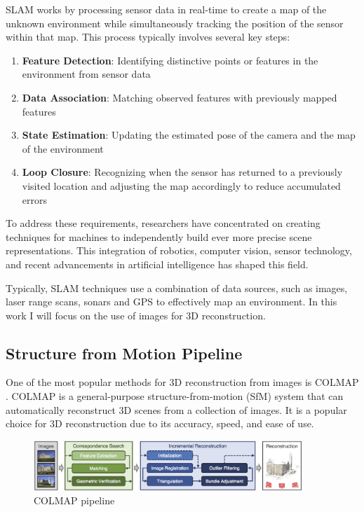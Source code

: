 SLAM works by processing sensor data in real-time to create a map of the unknown environment while simultaneously tracking the position of the sensor within that map. This process typically involves several key steps:
\begin{enumerate}
  \item \textbf{Feature Detection}: Identifying distinctive points or features in the environment from sensor data
  \item \textbf{Data Association}: Matching observed features with previously mapped features
  \item \textbf{State Estimation}: Updating the estimated pose of the camera and the map of the environment
  \item \textbf{Loop Closure}: Recognizing when the sensor has returned to a previously visited location and adjusting the map accordingly to reduce accumulated errors
\end{enumerate}

To address these requirements, researchers have
concentrated on creating techniques for machines to independently
build ever more precise scene representations. This integration of
robotics, computer vision, sensor technology, and recent advancements
in artificial intelligence has shaped this field.

Typically, SLAM techniques use a combination of data sources, such as
images, laser range scans, sonars and GPS to effectively map an environment.
In this work I will focus on the use of images for 3D reconstruction.

\subsection{Structure from Motion Pipeline}

One of the most popular methods for 3D reconstruction from images is
COLMAP \cite{colmap}. COLMAP is a general-purpose
structure-from-motion (SfM) \cite{multipleviewgeometry} system that
can automatically reconstruct 3D scenes from a collection of images.
It is a popular choice for 3D reconstruction due to its accuracy,
speed, and ease of use.

\begin{figure}[h]
  \centering
  \includegraphics[width=0.9\textwidth]{images/related-work/COLMAP.png}
  \caption{COLMAP pipeline}
  \label{fig:colmap-pipeline}
\end{figure}

